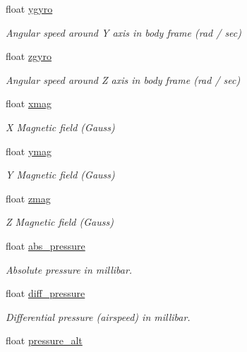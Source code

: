 \begin{DoxyCompactItemize}
float \hyperlink{struct____mavlink__hil__sensor__t_abdeea02a356a5802b5580fdd945bcbe6}{ygyro}
\begin{DoxyCompactList}\small\item\em Angular speed around Y axis in body frame (rad / sec) \end{DoxyCompactList}\item 
float \hyperlink{struct____mavlink__hil__sensor__t_ab7c2f35160da57fecb77a7e6b7d48dc9}{zgyro}
\begin{DoxyCompactList}\small\item\em Angular speed around Z axis in body frame (rad / sec) \end{DoxyCompactList}\item 
float \hyperlink{struct____mavlink__hil__sensor__t_a246f9f9b48771987750d94e15a0465f3}{xmag}
\begin{DoxyCompactList}\small\item\em X Magnetic field (Gauss) \end{DoxyCompactList}\item 
float \hyperlink{struct____mavlink__hil__sensor__t_a0693da306eb0d30f2b5502e51540d05b}{ymag}
\begin{DoxyCompactList}\small\item\em Y Magnetic field (Gauss) \end{DoxyCompactList}\item 
float \hyperlink{struct____mavlink__hil__sensor__t_a6db8180441080e7dcccfda7da09b1e2d}{zmag}
\begin{DoxyCompactList}\small\item\em Z Magnetic field (Gauss) \end{DoxyCompactList}\item 
float \hyperlink{struct____mavlink__hil__sensor__t_a7d05535dddd4be7c92b616ea644cb6cd}{abs\+\_\+pressure}
\begin{DoxyCompactList}\small\item\em Absolute pressure in millibar. \end{DoxyCompactList}\item 
float \hyperlink{struct____mavlink__hil__sensor__t_a614e2fe0a712bc9619669950f09dd21d}{diff\+\_\+pressure}
\begin{DoxyCompactList}\small\item\em Differential pressure (airspeed) in millibar. \end{DoxyCompactList}\item 
float \hyperlink{struct____mavlink__hil__sensor__t_aa7347c28c478d103f181d57aee8026de}{pressure\+\_\+alt}

\end{DoxyCompactItemize}
